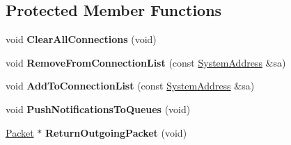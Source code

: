 \subsection*{Protected Member Functions}
\begin{DoxyCompactItemize}
\item 
\hypertarget{class_rak_net_1_1_packetized_t_c_p_a6ac983491358c7a5695507035efd47f2}{void {\bfseries Clear\-All\-Connections} (void)}\label{class_rak_net_1_1_packetized_t_c_p_a6ac983491358c7a5695507035efd47f2}

\item 
\hypertarget{class_rak_net_1_1_packetized_t_c_p_a48c26ed46b88b985622b5bfd65a5b5a4}{void {\bfseries Remove\-From\-Connection\-List} (const \hyperlink{struct_rak_net_1_1_system_address}{System\-Address} \&sa)}\label{class_rak_net_1_1_packetized_t_c_p_a48c26ed46b88b985622b5bfd65a5b5a4}

\item 
\hypertarget{class_rak_net_1_1_packetized_t_c_p_ad0bd634fdadb413323ff0d834a391a08}{void {\bfseries Add\-To\-Connection\-List} (const \hyperlink{struct_rak_net_1_1_system_address}{System\-Address} \&sa)}\label{class_rak_net_1_1_packetized_t_c_p_ad0bd634fdadb413323ff0d834a391a08}

\item 
\hypertarget{class_rak_net_1_1_packetized_t_c_p_ac89d67d213aac17c680e374b6bdc1ba0}{void {\bfseries Push\-Notifications\-To\-Queues} (void)}\label{class_rak_net_1_1_packetized_t_c_p_ac89d67d213aac17c680e374b6bdc1ba0}

\item 
\hypertarget{class_rak_net_1_1_packetized_t_c_p_af4d3a4a9860cc0ab9a2fa656b5e45c3d}{\hyperlink{struct_rak_net_1_1_packet}{Packet} $\ast$ {\bfseries Return\-Outgoing\-Packet} (void)}\label{class_rak_net_1_1_packetized_t_c_p_af4d3a4a9860cc0ab9a2fa656b5e45c3d}

\end{DoxyCompactItemize}
